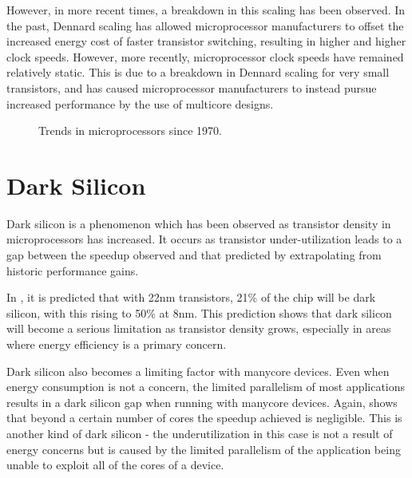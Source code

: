 \documentclass{UoYCSproject}
\begin{document}
However, in more recent times, a breakdown in this scaling has been observed. In the past, Dennard scaling has allowed
microprocessor manufacturers to offset the increased energy cost of faster transistor switching, resulting in higher
and higher clock speeds. However, more recently, microprocessor clock speeds have remained relatively static. This is
due to a breakdown in Dennard scaling for very small transistors, and has caused microprocessor manufacturers to instead
pursue increased performance by the use of multicore designs.

\begin{figure}[h]
\caption{Trends in microprocessors since 1970. \cite{karlrupp}}
\end{figure}

\section{Dark Silicon}

Dark silicon is a phenomenon which has been observed as transistor density in microprocessors has increased.
It occurs as transistor under-utilization leads to a gap between the speedup observed and that predicted by
extrapolating from historic performance gains.

In \cite{darksilicon}, it is predicted that with 22nm transistors, 21\% of the chip will be dark silicon,
with this rising to 50\% at 8nm. This prediction shows that dark silicon will become a serious limitation
as transistor density grows, especially in areas where energy efficiency is a primary concern.

Dark silicon also becomes a limiting factor with manycore devices. Even when energy consumption is not a
concern, the limited parallelism of most applications results in a dark silicon gap when running with
manycore devices. Again, \cite{darksilicon} shows that beyond a certain number of cores the speedup achieved
is negligible. This is another kind of dark silicon - the underutilization in this case is not a result of
energy concerns but is caused by the limited parallelism of the application being unable to exploit all of
the cores of a device.
\end{document}
